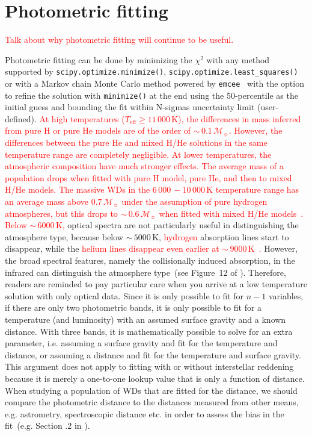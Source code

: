 \documentclass[fleqn,usenatbib]{rasti}
\newcommand{\msun}{\mathcal{M}_{\sun}}
\begin{document}
\section{Photometric fitting}
\textcolor{red}{Talk about why photometric fitting will continue to be useful.}


Photometric fitting can be done by minimizing the $\chi^2$ with any method
supported by \verb+scipy.optimize.minimize()+,
\verb+scipy.optimize.least_squares()+ or with a Markov chain Monte
Carlo method powered by \texttt{emcee}~\citep{2013PASP..125..306F} with the
option to refine the solution with \verb+minimize()+ at the end using the
50-percentile as the initial guess and bounding the fit within N-sigmas
uncertainty limit (user-defined). \textcolor{red}{At high temperatures
($T_{\mathrm{eff}} \geq 11\,000$\,K), the differences in mass inferred from
pure H or pure He models are of the order of $\sim$\,$0.1\,\msun$. However,
the differences between the pure He and mixed H/He solutions in the same
temperature range are completely negligible. At lower temperatures, the
atmospheric composition have much stronger effects. The average mass of a
population drops when fitted with pure H model, pure He, and then to mixed
H/He models. The massive WDs in the $6\,000\,-10\,000$\,K temperature range
has an average mass above $0.7\,\msun$ under the assumption of pure hydrogen
atmospheres, but this drops to $\sim$\,$0.6\,\msun$ when fitted with mixed
H/He models~\citep{2019ApJ...876...67B}. Below $\sim$\,$6000$\,K,} optical
spectra are not particularly useful in distinguishing the atmosphere
type, because below $\sim$\,$5000$\,K, \textcolor{red}{hydrogen} absorption
lines start to disappear, while the \textcolor{red}{helium lines disappear
even earlier at $\sim$\,$9000$\,K~\citep{2018ApJ...857...56R}.} However, the
broad spectral features, namely the collisionally induced absorption, in the
infrared can distinguish the atmosphere type~(see Figure~12 of
\citealt{2017ApJ...848...36B}). Therefore, readers are reminded to pay
particular care when you arrive at a low temperature solution with only
optical data. Since it is only possible to fit for $n-1$ variables, if there
are only two photometric bands, it is only possible to fit for a temperature
(and luminosity) with an assumed surface gravity and a known distance. With
three bands, it is mathematically possible to solve for an extra parameter,
i.e. assuming a surface gravity and fit for the temperature and distance, or
assuming a distance and fit for the temperature and surface gravity. This
argument does not apply to fitting with or without interstellar reddening because
it is merely a one-to-one lookup value that is
only a function of distance. When studying a population of WDs that are fitted
for the distance, we should compare the photometric distance to the distances
measured from other means, e.g. astrometry, spectroscopic distance etc. in order
to assess the bias in the fit~(e.g. Section .2
in \citealt{2011MNRAS.417...93R}).
\end{document}
